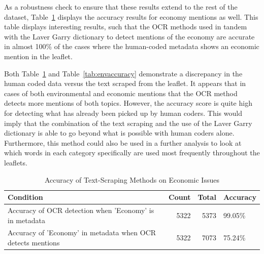 \documentclass[preprint]{elsarticle} %
\begin{document}
\vspace{0.5cm}

As a robustness check to ensure that these results extend to the rest of the dataset, Table~\ref{tab:econaccuracy} displays the accuracy results for economy mentions as well. This table displays interesting results, such that the OCR methods used in tandem with the Laver Garry dictionary \citep{laverEstimatingPolicyPositions2000} to detect mentions of the economy are accurate in almost 100\% of the cases where the human-coded metadata shows an economic mention in the leaflet. 

Both Table~\ref{tab:econaccuracy} and Table~\ref{tab:envaccuracy} demonstrate a discrepancy in the human coded data versus the text scraped from the leaflet. It appears that in cases of both environmental and economic mentions that the OCR method detects more mentions of both topics. However, the accuracy score is quite high for detecting what has already been picked up by human coders. This would imply that the combination of the text scraping and the use of the Laver Garry dictionary is able to go beyond what is possible with human coders alone. Furthermore, this method could also be used in a further analysis to look at which words in each category specifically are used most frequently throughout the leaflets. 


\vspace{1cm}

\begin{table}[!htbp] 
	\caption{Accuracy of Text-Scraping Methods on Economic Issues} 
	\label{tab:econaccuracy} 
	\begin{tabular}{lrrl}
		\toprule
		Condition & Count & Total & Accuracy \\
		\midrule
		Accuracy of OCR detection when 'Economy' is in metadata & 5322 & 5373 & 99.05\% \\
		Accuracy of 'Economy' in metadata when OCR detects mentions & 5322 & 7073 & 75.24\% \\
		\bottomrule
	\end{tabular}\\
\end{table}


\vspace{1cm}
\end{document}
